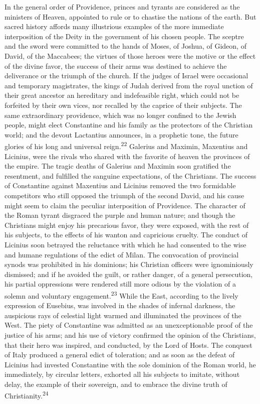 In the general order of Providence, princes and tyrants are considered
as the ministers of Heaven, appointed to rule or to chastise the
nations of the earth. But sacred history affords many illustrious
examples of the more immediate interposition of the Deity in the
government of his chosen people. The sceptre and the sword were
committed to the hands of Moses, of Joshua, of Gideon, of David, of the
Maccabees; the virtues of those heroes were the motive or the effect of
the divine favor, the success of their arms was destined to achieve the
deliverance or the triumph of the church. If the judges of Israel were
occasional and temporary magistrates, the kings of Judah derived from
the royal unction of their great ancestor an hereditary and
indefeasible right, which could not be forfeited by their own vices,
nor recalled by the caprice of their subjects. The same extraordinary
providence, which was no longer confined to the Jewish people, might
elect Constantine and his family as the protectors of the Christian
world; and the devout Lactantius announces, in a prophetic tone, the
future glories of his long and universal reign.\textsuperscript{22} Galerius and
Maximin, Maxentius and Licinius, were the rivals who shared with the
favorite of heaven the provinces of the empire. The tragic deaths of
Galerius and Maximin soon gratified the resentment, and fulfilled the
sanguine expectations, of the Christians. The success of Constantine
against Maxentius and Licinius removed the two formidable competitors
who still opposed the triumph of the second David, and his cause might
seem to claim the peculiar interposition of Providence. The character
of the Roman tyrant disgraced the purple and human nature; and though
the Christians might enjoy his precarious favor, they were exposed,
with the rest of his subjects, to the effects of his wanton and
capricious cruelty. The conduct of Licinius soon betrayed the
reluctance with which he had consented to the wise and humane
regulations of the edict of Milan. The convocation of provincial synods
was prohibited in his dominions; his Christian officers were
ignominiously dismissed; and if he avoided the guilt, or rather danger,
of a general persecution, his partial oppressions were rendered still
more odious by the violation of a solemn and voluntary engagement.\textsuperscript{23}
While the East, according to the lively expression of Eusebius, was
involved in the shades of infernal darkness, the auspicious rays of
celestial light warmed and illuminated the provinces of the West. The
piety of Constantine was admitted as an unexceptionable proof of the
justice of his arms; and his use of victory confirmed the opinion of
the Christians, that their hero was inspired, and conducted, by the
Lord of Hosts. The conquest of Italy produced a general edict of
toleration; and as soon as the defeat of Licinius had invested
Constantine with the sole dominion of the Roman world, he immediately,
by circular letters, exhorted all his subjects to imitate, without
delay, the example of their sovereign, and to embrace the divine truth
of Christianity.\textsuperscript{24}

